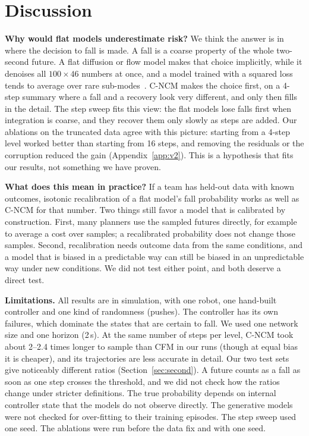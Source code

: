 \documentclass[conference]{IEEEtran}
\newcommand{\cncm}{C-NCM}
\begin{document}
\section{Discussion}
\label{sec:disc}

\textbf{Why would flat models underestimate risk?} We think the answer is in where the
decision to fall is made. A fall is a coarse property of the whole two-second future. A
flat diffusion or flow model makes that choice implicitly, while it denoises all
$100\times46$ numbers at once, and a model trained with a squared loss tends to average
over rare sub-modes~\cite{lin2026subflow}. \cncm{} makes the choice first, on a 4-step
summary where a fall and a recovery look very different, and only then fills in the
detail. The step sweep fits this view: the flat models lose falls first when integration
is coarse, and they recover them only slowly as steps are added. Our ablations on the
truncated data agree with this picture: starting from a 4-step level worked better than
starting from 16 steps, and removing the residuals or the corruption reduced the gain
(Appendix~\ref{app:v2}). This is a hypothesis that fits our results, not something we have
proven.

\textbf{What does this mean in practice?} If a team has held-out data with known
outcomes, isotonic recalibration of a flat model's fall probability works as well as
\cncm{} for that number. Two things still favor a model that is calibrated by
construction. First, many planners use the sampled futures directly, for example to
average a cost over samples; a recalibrated probability does not change those samples.
Second, recalibration needs outcome data from the same conditions, and a model that is
biased in a predictable way can still be biased in an unpredictable way under new
conditions. We did not test either point, and both deserve a direct test.

\textbf{Limitations.} All results are in simulation, with one robot, one hand-built
controller and one kind of randomness (pushes). The controller has its own failures, which
dominate the states that are certain to fall. We used one network size and one horizon
(2\,s). At the same number of steps per level, \cncm{} took about 2--2.4 times longer to
sample than CFM in our runs (though at equal bias it is cheaper), and its trajectories are
less accurate in detail. Our two test sets give noticeably different ratios
(Section~\ref{sec:second}). A future counts as a fall as soon as one step crosses the
threshold, and we did not check how the ratios change under stricter definitions. The true
probability depends on internal controller state that the models do not observe directly.
The generative models were not checked for over-fitting to their training episodes. The
step sweep used one seed. The ablations were run before the data fix and with one seed.
\end{document}
